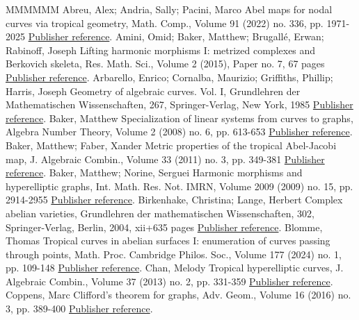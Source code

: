 \begin{thebibliography}{MMMMMM}
 Abreu, Alex; Andria, Sally; Pacini, Marco Abel maps for nodal curves via tropical geometry, Math. Comp., Volume 91 (2022) no. 336, pp. 1971-2025 \href{https://alco.centre-mersenne.org/articles/10.5802/alco.452/#AbreuAndriaPacini_AbelMaps}{Publisher reference}.
 Amini, Omid; Baker, Matthew; Brugallé, Erwan; Rabinoff, Joseph Lifting harmonic morphisms I: metrized complexes and Berkovich skeleta, Res. Math. Sci., Volume 2 (2015), Paper no. 7, 67 pages \href{https://alco.centre-mersenne.org/articles/10.5802/alco.452/#ABBR}{Publisher reference}.
 Arbarello, Enrico; Cornalba, Maurizio; Griffiths, Phillip; Harris, Joseph Geometry of algebraic curves. Vol. I, Grundlehren der Mathematischen Wissenschaften, 267, Springer-Verlag, New York, 1985 \href{https://alco.centre-mersenne.org/articles/10.5802/alco.452/#ACGHI}{Publisher reference}.
 Baker, Matthew Specialization of linear systems from curves to graphs, Algebra Number Theory, Volume 2 (2008) no. 6, pp. 613-653 \href{https://alco.centre-mersenne.org/articles/10.5802/alco.452/#BC}{Publisher reference}.
 Baker, Matthew; Faber, Xander Metric properties of the tropical Abel-Jacobi map, J. Algebraic Combin., Volume 33 (2011) no. 3, pp. 349-381 \href{https://alco.centre-mersenne.org/articles/10.5802/alco.452/#BF11}{Publisher reference}.
 Baker, Matthew; Norine, Serguei Harmonic morphisms and hyperelliptic graphs, Int. Math. Res. Not. IMRN, Volume 2009 (2009) no. 15, pp. 2914-2955 \href{https://alco.centre-mersenne.org/articles/10.5802/alco.452/#BN09}{Publisher reference}.
 Birkenhake, Christina; Lange, Herbert Complex abelian varieties, Grundlehren der mathematischen Wissenschaften, 302, Springer-Verlag, Berlin, 2004, xii+635 pages \href{https://alco.centre-mersenne.org/articles/10.5802/alco.452/#BL04}{Publisher reference}.
 Blomme, Thomas Tropical curves in abelian surfaces I: enumeration of curves passing through points, Math. Proc. Cambridge Philos. Soc., Volume 177 (2024) no. 1, pp. 109-148 \href{https://alco.centre-mersenne.org/articles/10.5802/alco.452/#Blomme_CurvesInAbelian1}{Publisher reference}.
 Chan, Melody Tropical hyperelliptic curves, J. Algebraic Combin., Volume 37 (2013) no. 2, pp. 331-359 \href{https://alco.centre-mersenne.org/articles/10.5802/alco.452/#CH}{Publisher reference}.
 Coppens, Marc Clifford’s theorem for graphs, Adv. Geom., Volume 16 (2016) no. 3, pp. 389-400 \href{https://alco.centre-mersenne.org/articles/10.5802/alco.452/#Coppens_Clifford}{Publisher reference}.

\end{thebibliography}
